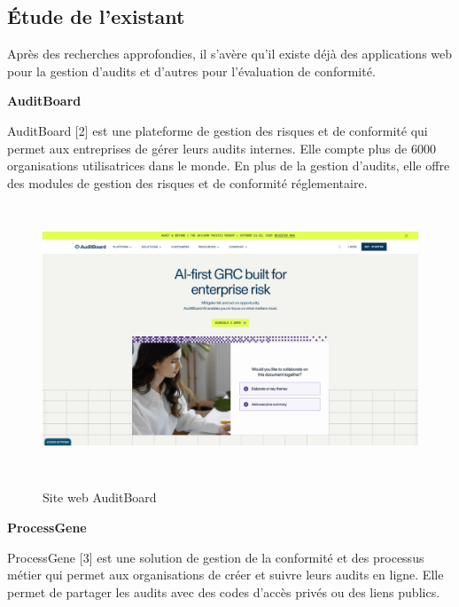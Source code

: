 \subsection{Étude de l'existant}

\noindent Après des recherches approfondies, il s'avère qu'il existe déjà des applications web pour la gestion d'audits et d'autres pour l'évaluation de conformité.

\noindent\textbf{AuditBoard}\normalsize
\vspace{0.3em}

\noindent AuditBoard [2] est une plateforme de gestion des risques et de conformité qui permet aux entreprises de gérer leurs audits internes. Elle compte plus de 6000 organisations utilisatrices dans le monde. En plus de la gestion d'audits, elle offre des modules de gestion des risques et de conformité réglementaire.

\begin{figure}[H]%
    \center%
{
    \includegraphics[width=13cm,height=8cm]{images/auditboard.PNG}%
    }
    \caption{Site web AuditBoard}%
\end{figure}

\noindent\textbf{ProcessGene}\normalsize
\vspace{0.3em}

\noindent ProcessGene [3] est une solution de gestion de la conformité et des processus métier qui permet aux organisations de créer et suivre leurs audits en ligne. Elle permet de partager les audits avec des codes d'accès privés ou des liens publics.

